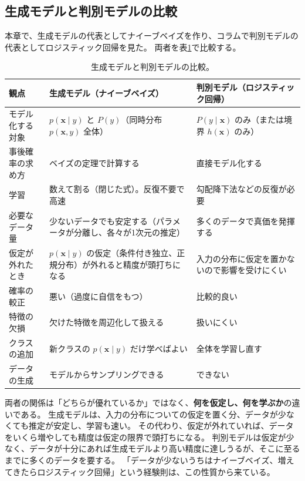 \subsection{生成モデルと判別モデルの比較}

本章で、生成モデルの代表としてナイーブベイズを作り、コラムで判別モデルの代表としてロジスティック回帰を見た。
両者を表\ref{tab:ch8-gen-disc}で比較する。

\begin{table}[H]
  \centering
  \caption{生成モデルと判別モデルの比較。}
  \label{tab:ch8-gen-disc}
  \small
  \begin{tabular}{p{2.6cm}|p{5.6cm}|p{5.6cm}}
    \hline
    観点 & 生成モデル（ナイーブベイズ） & 判別モデル（ロジスティック回帰） \\
    \hline\hline
    モデル化する対象 & $p(\bm{x} \mid y)$ と $P(y)$（同時分布 $p(\bm{x}, y)$ 全体） & $P(y \mid \bm{x})$ のみ（または境界 $h(\bm{x})$ のみ） \\
    \hline
    事後確率の求め方 & ベイズの定理で計算する & 直接モデル化する \\
    \hline
    学習 & 数えて割る（閉じた式）。反復不要で高速 & 勾配降下法などの反復が必要 \\
    \hline
    必要なデータ量 & 少ないデータでも安定する（パラメータが分離し、各々が1次元の推定） & 多くのデータで真価を発揮する \\
    \hline
    仮定が外れたとき & $p(\bm{x} \mid y)$ の仮定（条件付き独立、正規分布）が外れると精度が頭打ちになる & 入力の分布に仮定を置かないので影響を受けにくい \\
    \hline
    確率の較正 & 悪い（過度に自信をもつ） & 比較的良い \\
    \hline
    特徴の欠損 & 欠けた特徴を周辺化して扱える & 扱いにくい \\
    \hline
    クラスの追加 & 新クラスの $p(\bm{x} \mid y)$ だけ学べばよい & 全体を学習し直す \\
    \hline
    データの生成 & モデルからサンプリングできる & できない \\
    \hline
  \end{tabular}
\end{table}

両者の関係は「どちらが優れているか」ではなく、\textbf{何を仮定し、何を学ぶか}の違いである。
生成モデルは、入力の分布についての仮定を置く分、データが少なくても推定が安定し、学習も速い。
その代わり、仮定が外れていれば、データをいくら増やしても精度は仮定の限界で頭打ちになる。
判別モデルは仮定が少なく、データが十分にあれば生成モデルより高い精度に達しうるが、そこに至るまでに多くのデータを要する。
「データが少ないうちはナイーブベイズ、増えてきたらロジスティック回帰」という経験則は、この性質から来ている。

